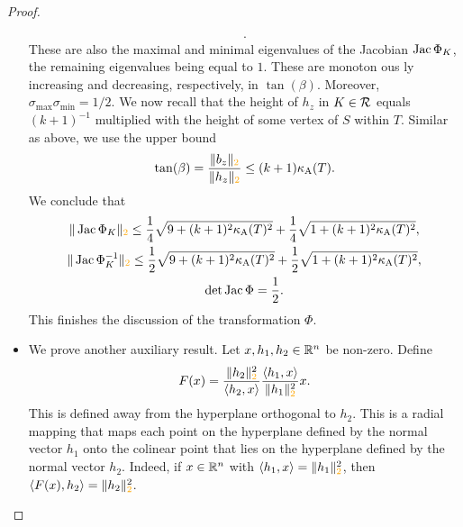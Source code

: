 \documentclass[10pt,letterpaper]{article}
\newcommand\cye[1]{%
  \protect\leavevmode
  \begingroup
    \color{red!35!yellow}%
    #1%
  \endgroup
}
\begin{document}
\begin{proof}
\begin{itemize}
\begin{align*}
            .
        \end{align*}
        These are also the maximal and minimal eigenvalues of the Jacobian $\operatorname{{\rm Jac}} \Phi_{K}$, the remaining eigenvalues being equal to $1$. 
        These are monoton\cye{ous}ly increasing and decreasing, respectively, in $\tan(\beta)$. 
        Moreover, $\sigma_{\max} \sigma_{\min} = 1/2$. 
        We now recall that the height of $h_{z}$ in $K \in {\mathcal R}$ equals $(k+1)^{-1}$ multiplied with the height of some vertex of $S$ within $T$.
        Similar as above, we use the upper bound 
        \begin{align*}
            \tan(\beta) = \frac{\|b_z\|_{\cye{2}}}{\|h_z\|_{\cye{2}}} \leq (k+1) \kappa_{\maxcol}(T).
        \end{align*}
        We conclude that 
        \begin{gather*}
            \| \Jacobian\Phi_{K} \|_{\cye{2}} 
            \leq 
            \frac 1 4 \sqrt{ 9 + (k+1)^2 \kappa_{\maxcol}(T)^2 } + \frac 1 4 \sqrt{ 1 + (k+1)^2 \kappa_{\maxcol}(T)^2 }
            ,
            \\
            \| \Jacobian\Phi_{K}^{-1} \|_{\cye{2}} 
            \leq 
            \frac 1 2 \sqrt{ 9 + (k+1)^2 \kappa_{\maxcol}(T)^2 } + \frac 1 2 \sqrt{ 1 + (k+1)^2 \kappa_{\maxcol}(T)^2 }
            ,
            \\
            \det \Jacobian\Phi = \frac 1 2 
            .
        \end{gather*}
        This finishes the discussion of the transformation $\Phi$.

        
        \item 
        We prove another auxiliary result.
        Let $x, h_1, h_2 \in {\mathbb R}^{n}$ be non-zero. 
        Define 
        \begin{align*}
            F(x) 
            = 
            \frac{ \| h_2 \|_{\cye{2}}^{2} }{ \langle h_2, x \rangle }
            \frac{ \langle h_1, x \rangle }{ \| h_1 \|_{\cye{2}}^{2} }
            x
            .
        \end{align*}
        This is defined away from the hyperplane orthogonal to $h_2$.
        This is a radial mapping that maps each point on the hyperplane defined by the normal vector $h_1$
        onto the colinear point that lies on the hyperplane defined by the normal vector $h_2$. Indeed, 
        if $x \in {\mathbb R}^{n}$ with $\langle h_1, x \rangle = \| h_1 \|_{\cye{2}}^{2}$, then $\langle F(x), h_2 \rangle = \| h_2 \|_{\cye{2}}^{2}$.
        

\end{itemize}
\end{proof}
\end{document}
